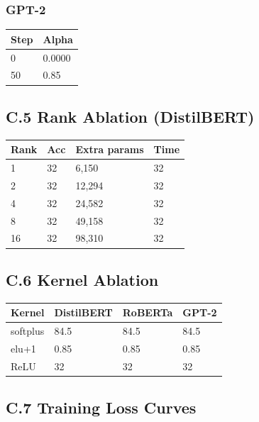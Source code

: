 \subsubsection{GPT-2}

\begin{table}[H]
\centering
\small
\begin{tabular}{ll}
\toprule
\textbf{Step} & \textbf{Alpha} \\
\midrule
0 & 0.0000 \\
50 & 0.85 \\
\bottomrule
\end{tabular}
\end{table}

\subsection{C.5 Rank Ablation (DistilBERT)}

\begin{table}[H]
\centering
\small
\begin{tabular}{llll}
\toprule
\textbf{Rank} & \textbf{Acc} & \textbf{Extra params} & \textbf{Time} \\
\midrule
1 & 32 & 6,150 & 32 \\
2 & 32 & 12,294 & 32 \\
4 & 32 & 24,582 & 32 \\
8 & 32 & 49,158 & 32 \\
16 & 32 & 98,310 & 32 \\
\bottomrule
\end{tabular}
\end{table}

\subsection{C.6 Kernel Ablation}

\begin{table}[H]
\centering
\small
\begin{tabular}{llll}
\toprule
\textbf{Kernel} & \textbf{DistilBERT} & \textbf{RoBERTa} & \textbf{GPT-2} \\
\midrule
softplus & 84.5 & 84.5 & 84.5 \\
elu+1 & 0.85 & 0.85 & 0.85 \\
ReLU & 32 & 32 & 32 \\
\bottomrule
\end{tabular}
\end{table}

\subsection{C.7 Training Loss Curves}

